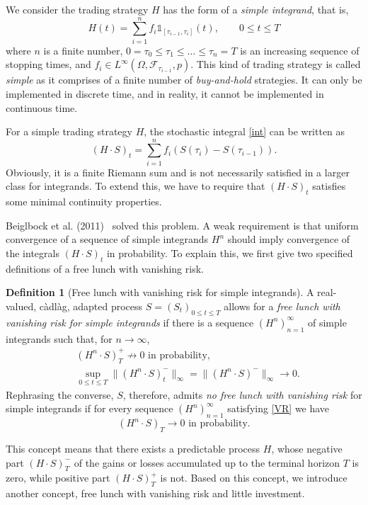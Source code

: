 \documentclass[a4paper]{article}
\theoremstyle{definition}
\newtheorem{definition}[theorem]{Definition}
\numberwithin{equation}{section}
\begin{document}
We consider the trading strategy $H$ has the form of a \emph{simple integrand}, that is,
\begin{equation}\label{int}
H(t)=\sum^n_{i=1}f_i\mathds1_{[\tau_{i-1},\tau_i]}(t),\qquad 0\leq t\leq T
\end{equation}
where $n$ is a finite number, $0=\tau_0\leq\tau_1\leq\dots\leq\tau_n=T$ is an increasing sequence of stopping times, and $f_i\in L^\infty(\Omega,\mathcal F_{\tau_{i-1}},p)$. This kind of trading strategy is called \emph{simple} as it comprises of a finite number of \emph{buy-and-hold} strategies. It can only be implemented in discrete time, and in reality, it cannot be implemented in continuous time.

For a simple trading strategy $H$, the stochastic integral \eqref{int} can be written as
$$(H\cdot S)_t=\sum^n_{i=1}f_i(S(\tau_i)-S(\tau_{i-1})).$$
Obviously, it is a finite Riemann sum and is not necessarily satisfied in a larger class for integrands. To extend this, we have to require that $(H\cdot S)_t$ satisfies some minimal continuity properties.

Beiglbock et al. (2011)~\cite{def_no free lunch} solved this problem. A weak requirement is that uniform convergence of a sequence of simple integrands $H^n$ should imply convergence of the integrals $(H\cdot S)_t$ in probability. To explain this, we first give two specified definitions of a free lunch with vanishing risk.

\begin{definition}[Free lunch with vanishing risk for simple integrands]\label{def:NFLVR_simple}
A real-valued, c\`adl\`ag, adapted process $S=(S_t)_{0\leq t\leq T}$ allows for a \emph{free lunch with vanishing risk for simple integrands} if there is a sequence $(H^n)^\infty_{n=1}$ of simple integrands such that, for $n\rightarrow\infty$,
\begin{eqnarray}
&(H^n\cdot S)_T^+\nrightarrow0\text{ in probability},\label{FL}\\
&\sup_{0\leq t\leq T}\|(H^n\cdot S)_t^-\|_\infty=\|(H^n\cdot S)^-\|_\infty\rightarrow0.\label{VR}
\end{eqnarray}
Rephrasing the converse, $S$, therefore, admits \emph{no free lunch with vanishing risk} for simple integrands if for every sequence $(H^n)^\infty_{n=1}$ satisfying \eqref{VR} we have
$$(H^n\cdot S)_T\rightarrow0\text{ in probability}.$$
\end{definition}

This concept means that there exists a predictable process $H$, whose negative part $(H\cdot S)_T^-$ of the gains or losses accumulated up to the terminal horizon $T$ is zero, while positive part $(H\cdot S)_T^+$ is not. Based on this concept, we introduce another concept, free lunch with vanishing risk and little investment.
\end{document}
